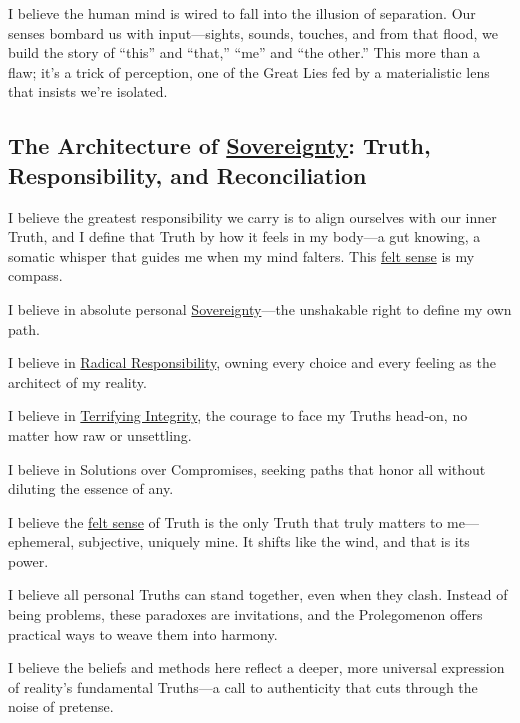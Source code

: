 \documentclass{article}
\begin{document}
I believe the human mind is wired to fall into the illusion of separation. Our senses bombard us with input—sights, sounds, touches, and from that flood, we build the story of “this” and “that,” “me” and “the other.” This more than a flaw; it's a trick of perception, one of the Great Lies fed by a materialistic lens that insists we're isolated.

\subsection*{The Architecture of \hyperlink{gloss:sovereignty}{Sovereignty}: Truth, Responsibility, and Reconciliation}

I believe the greatest responsibility we carry is to align ourselves with our inner Truth, and I define that Truth by how it feels in my body—a gut knowing, a somatic whisper that guides me when my mind falters. This \hyperlink{gloss:felt_sense}{felt sense} is my compass.

I believe in absolute personal \hyperlink{gloss:sovereignty}{Sovereignty}—the unshakable right to define my own path.

I believe in \hyperlink{gloss:radical_responsibility}{Radical Responsibility}, owning every choice and every feeling as the architect of my reality.

I believe in \hyperlink{gloss:terrifying_integrity}{Terrifying Integrity}, the courage to face my Truths head-on, no matter how raw or unsettling.

I believe in Solutions over Compromises, seeking paths that honor all without diluting the essence of any.

I believe the \hyperlink{gloss:felt_sense}{felt sense} of Truth is the only Truth that truly matters to me—ephemeral, subjective, uniquely mine. It shifts like the wind, and that is its power.

I believe all personal Truths can stand together, even when they clash. Instead of being problems, these paradoxes are invitations, and the Prolegomenon offers practical ways to weave them into harmony.

I believe the beliefs and methods here reflect a deeper, more universal expression of reality's fundamental Truths—a call to authenticity that cuts through the noise of pretense.
\end{document}

